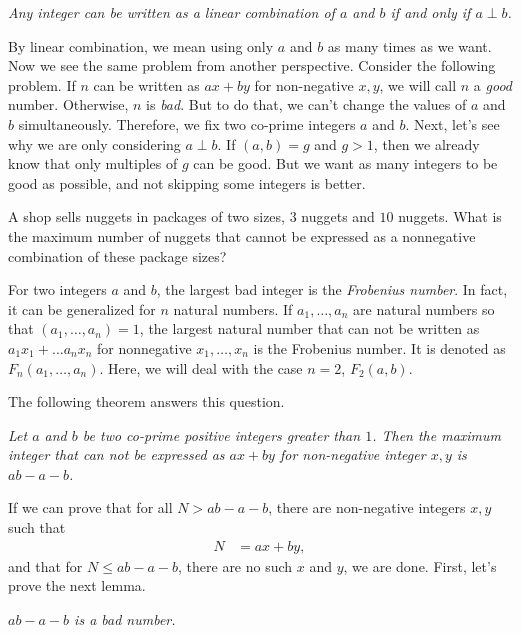\documentclass{subfile}
\begin{document}
	\begin{theorem}\slshape
		Any integer can be written as a linear combination of $a$ and $b$ if and only if $a\perp b$.
	\end{theorem}
By linear combination, we mean using only $a$ and $b$ as many times as we want. Now we see the same problem from another perspective. Consider the following problem. If $n$ can be written as $ax+by$ for non-negative $x,y$, we will call $n$ a \textit{good} number. Otherwise, $n$ is \textit{bad}. But to do that, we can't change the values of $a$ and $b$ simultaneously. Therefore, we fix two co-prime integers $a$ and $b$. Next, let's see why we are only considering $a\perp b$. If $(a,b)=g$ and $g>1$, then we already know that only multiples of $g$ can be good. But we want as many integers to be good as possible, and not skipping some integers is better.
	\begin{problem}
		A shop sells nuggets in packages of two sizes, $3$ nuggets and $10$ nuggets. What is the maximum number of nuggets that cannot be expressed as a nonnegative combination of these package sizes?
	\end{problem}
	
	\begin{definition}
		For two integers $a$ and $b$, the largest bad integer is the \textit{Frobenius number}. In fact, it can be generalized for $n$ natural numbers. If $a_1,\ldots,a_n$ are natural numbers so that $(a_1,\ldots,a_n)=1$, the largest natural number that can not be written as $a_1x_1+\ldots a_nx_n$ for nonnegative $x_1,\ldots,x_n$ is the Frobenius number. It is denoted as $F_n(a_1,\ldots,a_n)$. Here, we will deal with the case $n=2$, $F_2(a,b)$.
	\end{definition}
The following theorem answers this question.
	\begin{theorem}\slshape
		Let $a$ and $b$ be two co-prime positive integers greater than $1$. Then the maximum integer that can not be expressed as $ax+by$ for non-negative integer $x,y$ is $ab-a-b$.
	\end{theorem}
If we can prove that for all $N>ab-a-b$, there are non-negative integers $x,y$ such that
	\begin{align*}
		N & = ax+by,
	\end{align*}
and that for $N\leq ab-a-b$, there are no such $x$ and $y$, we are done. First, let's prove the next lemma.
	\begin{lemma}\slshape
		$ab-a-b$ is a bad number.
	\end{lemma}
	
\end{document}
